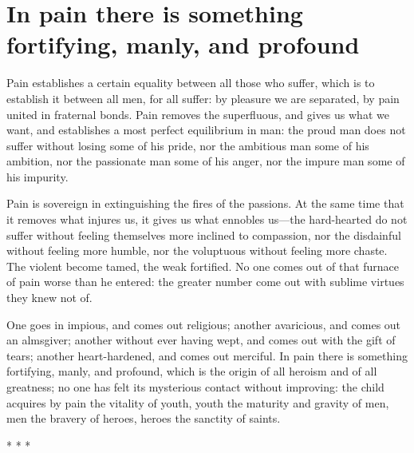 \section{In pain there is something fortifying, manly, and profound}

\begin{quotationx}
Pain establishes a certain equality between all those who suffer, which is to establish it between all men, for all suffer: by pleasure we are separated, by pain united in fraternal bonds. Pain removes the superfluous, and gives us what we want, and establishes a most perfect equilibrium in man: the proud man does not suffer without losing some of his pride, nor the ambitious man some of his ambition, nor the passionate man some of his anger, nor the impure man some of his impurity.

Pain is sovereign in extinguishing the fires of the passions. At the same time that it removes what injures us, it gives us what ennobles us---the hard-hearted do not suffer without feeling themselves more inclined to compassion, nor the disdainful without feeling more humble, nor the voluptuous without feeling more chaste. The violent become tamed, the weak fortified. No one comes out of that furnace of pain worse than he entered: the greater number come out with sublime virtues they knew not of.

One goes in impious, and comes out religious; another avaricious, and comes out an almsgiver; another without ever having wept, and comes out with the gift of tears; another heart-hardened, and comes out merciful. In pain there is something fortifying, manly, and profound, which is the origin of all heroism and of all greatness; no one has felt its mysterious contact without improving: the child acquires by pain the vitality of youth, youth the maturity and gravity of men, men the bravery of heroes, heroes the sanctity of saints.

\end{quotationx}




\begin{center}* * *\end{center}

